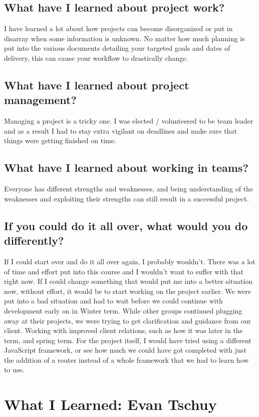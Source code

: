 \documentclass[onecolumn, draftclsnofoot,10pt, compsoc]{IEEEtran}
\begin{document}
\subsection{What have I learned about project work?}
I have learned a lot about how projects can become disorganized or put in disarray when some information is unknown. No matter how much planning is put into the various documents detailing your targeted goals and dates of delivery, this can cause your workflow to drastically change.

\subsection{What have I learned about project management?}
Managing a project is a tricky one. I was elected  / volunteered to be team leader and as a result I had to stay extra vigilant on deadlines and make sure that things were getting finished on time. 

\subsection{What have I learned about working in teams?}
Everyone has different strengths and weaknesses, and being understanding of the weaknesses and exploiting their strengths can still result in a successful project.

\subsection{If you could do it all over, what would you do differently?}
If I could start over and do it all over again, I probably wouldn't. There was a lot of time and effort put into this course and I wouldn't want to suffer with that right now. 
If I could change something that would put me into a better situation now, without effort, it would be to start working on the project earlier. We were put into a bad situation and had to wait before we could continue with development early on in Winter term. 
While other groups continued plugging away at their projects, we were trying to get clarification and guidance from our client. Working with improved client relations, such as how it was later in the term, and spring term. For the project itself, I would have tried using a different JavaScript framework, or see how much we could have got completed with just the addition of a router instead of a whole framework that we had to learn how to use.

\newpage
\section{What I Learned: Evan Tschuy}
\end{document}

